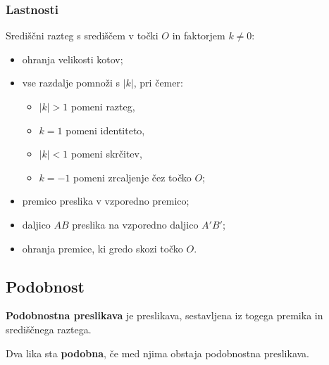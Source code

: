         
        
            \subsubsection*{Lastnosti}
                Središčni razteg s središčem v točki $O$ in faktorjem $k\neq 0$:
                \begin{itemize}
                    \item ohranja velikosti kotov;
                    \item vse razdalje pomnoži s $|k|$, pri čemer:
                        \begin{itemize}
                            \item $|k|>1$ pomeni razteg,
                            \item $k=1$ pomeni identiteto,
                            \item $|k|<1$ pomeni skrčitev,
                            \item $k=-1$ pomeni zrcaljenje čez točko $O$;
                        \end{itemize}
                    \item premico preslika v vzporedno premico;
                    \item daljico $AB$ preslika na vzporedno daljico $A'B'$;
                    \item ohranja premice, ki gredo skozi točko $O$.
                \end{itemize}
            
        


        
            \subsection*{Podobnost}


            \begin{definicija}
                \textbf{Podobnostna preslikava} je preslikava, sestavljena iz togega premika in središčnega raztega.
            \end{definicija}

            \begin{definicija}
                Dva lika sta \textbf{podobna}, če med njima obstaja podobnostna preslikava.
            \end{definicija}

